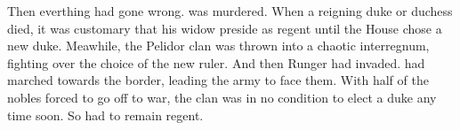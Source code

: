 Then everthing had gone wrong. 
\Icor{} was murdered. 
When a reigning duke or duchess died, it was customary that his widow preside as regent until the House chose a new duke. 
Meawhile, the Pelidor clan was thrown into a chaotic interregnum, fighting over the choice of the new ruler. 
And then Runger had invaded. 
\Sethgal{} had marched towards the border, leading the army to face them. 
With half of the nobles forced to go off to war, the clan was in no condition to elect a duke any time soon. 
So \Tiroco{} had to remain regent. 










